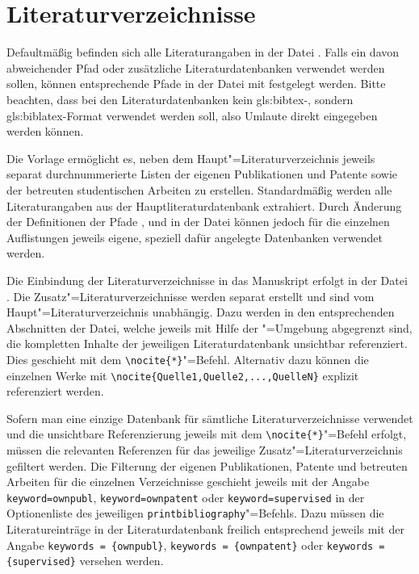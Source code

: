 \section{Literaturverzeichnisse}%
\label{sec:Literaturverzeichnisse}%
%
Defaultmäßig befinden sich alle Literaturangaben in der Datei
.
Falls ein davon abweichender Pfad oder zusätzliche Literaturdatenbanken
verwendet werden sollen, können entsprechende Pfade in der Datei
 mit
\lstinline||
festgelegt werden.
Bitte beachten, dass bei den Literaturdatenbanken kein \gls{gls:bibtex}-,
sondern \gls{gls:biblatex}-Format verwendet werden soll,
also Umlaute direkt eingegeben werden können.

Die Vorlage ermöglicht es, neben dem Haupt"=Literaturverzeichnis
jeweils separat durchnummerierte Listen der eigenen Publikationen und Patente
sowie der betreuten studentischen Arbeiten zu erstellen.
Standardmäßig werden alle Literaturangaben aus der Hauptliteraturdatenbank
 extrahiert.
Durch Änderung der Definitionen der Pfade
,
 und
in der Datei
können jedoch für die einzelnen Auflistungen 
jeweils eigene, speziell dafür angelegte Datenbanken verwendet werden.

Die Einbindung der Literaturverzeichnisse in das Manuskript erfolgt in der Datei
.
Die Zusatz"=Literaturverzeichnisse werden separat erstellt und sind vom Haupt"=Literaturverzeichnis unabhängig.
Dazu werden in den entsprechenden Abschnitten der Datei,
welche jeweils mit Hilfe der "=Umgebung abgegrenzt sind,
die kompletten Inhalte der jeweiligen Literaturdatenbank unsichtbar referenziert.
Dies geschieht mit dem \lstinline|\nocite{*}|"=Befehl.
Alternativ dazu können die einzelnen Werke mit
\lstinline|\nocite{Quelle1,Quelle2,...,QuelleN}|
explizit referenziert werden.

Sofern man eine einzige Datenbank für sämtliche Literaturverzeichnisse verwendet
und die unsichtbare Referenzierung jeweils mit dem \lstinline|\nocite{*}|"=Befehl erfolgt,
müssen die relevanten Referenzen für das jeweilige Zusatz"=Literaturverzeichnis
gefiltert werden.
Die Filterung der eigenen Publikationen, Patente und betreuten Arbeiten
für die einzelnen Verzeichnisse geschieht jeweils mit der Angabe
\lstinline|keyword=ownpubl|,
\lstinline|keyword=ownpatent|
oder
\lstinline|keyword=supervised|
in der Optionenliste des jeweiligen
\lstinline|printbibliography|"=Befehls.
Dazu müssen die Literatureinträge in der Literaturdatenbank freilich
entsprechend jeweils mit der Angabe
\lstinline|keywords = {ownpubl}|,
\lstinline|keywords = {ownpatent}|
oder
\lstinline|keywords = {supervised}|
versehen werden.

